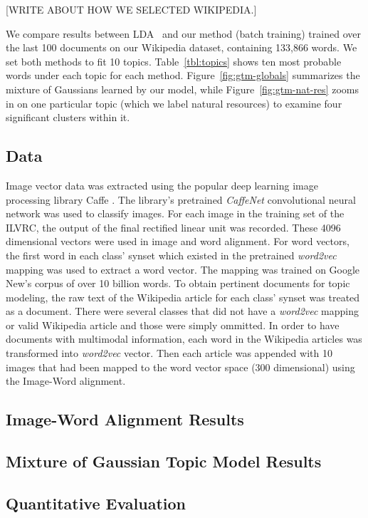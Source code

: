 \documentclass[11pt]{article}
\begin{document}
[WRITE ABOUT HOW WE SELECTED WIKIPEDIA.]

We compare results between LDA~\cite{Blei03} and our method (batch training) trained over the last 100 documents on our Wikipedia dataset, containing 133,866 words. We set both methods to fit 10 topics. Table~\ref{tbl:topics} shows ten most probable words under each topic for each method. Figure~\ref{fig:gtm-globals} summarizes the mixture of Gaussians learned by our model, while Figure~\ref{fig:gtm-nat-res} zooms in on one particular topic (which we label natural resources) to examine four significant clusters within it. 

\subsection{Data}
\label{sec:data}
Image vector data was extracted using the popular deep learning image processing library Caffe \cite{Jia14}. The library's pretrained \textit{CaffeNet} convolutional neural network was used to classify images. For each image in the training set of the ILVRC, the output of the final rectified linear unit was recorded. These 4096 dimensional vectors were used in image and word alignment. For word vectors, the first word in each class' synset which existed in the pretrained \textit{word2vec} \cite{Mikolov13a} mapping was used to extract a word vector. The mapping was trained on Google New's corpus of over 10 billion words. To obtain pertinent documents for topic modeling, the raw text of the Wikipedia article for each class' synset was treated as a document. There were several classes that did not have a \textit{word2vec} mapping or valid Wikipedia article and those were simply ommitted. In order to have documents with multimodal information, each word in the Wikipedia articles was transformed into \textit{word2vec} vector. Then each article was appended with 10 images that had been mapped to the word vector space (300 dimensional) using the Image-Word alignment.

\subsection{Image-Word Alignment Results}

\subsection{Mixture of Gaussian Topic Model Results}

\subsection{Quantitative Evaluation}
\end{document}
